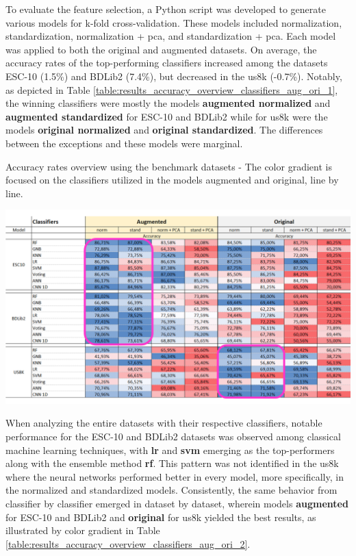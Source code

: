 To evaluate the feature selection, a Python script was developed to generate various models for k-fold cross-validation. These models included normalization, standardization, normalization + \gls{pca}, and standardization + \gls{pca}. Each model was applied to both the original and augmented datasets. On average, the accuracy rates of the top-performing classifiers increased among the datasets ESC-10 (1.5\%) and BDLib2 (7.4\%), but decreased in the \gls{us8k} (-0.7\%). Notably, as depicted in Table \ref{table:results_accuracy_overview_classifiers_aug_ori_1}, the winning classifiers were mostly the models \textbf{augmented normalized} and \textbf{augmented standardized} for ESC-10 and BDLib2 while for \gls{us8k} were the models \textbf{original normalized} and \textbf{original standardized}. The differences between the exceptions and these models were marginal.

\begin{table}[ht!]
    \caption[Accuracy rates overview using the benchmark datasets - Models augmented x original (Focus on the classifiers line by line)]{Accuracy rates overview using the benchmark datasets - The color gradient is focused on the classifiers utilized in the models augmented and original, line by line.}
    \label{table:results_accuracy_overview_classifiers_aug_ori_1}
     \raggedright
    \includegraphics[width=1\textwidth]{resources/images/060-results/Results_classification_overview_aug_x_ori_1.png}
\end{table}

When analyzing the entire datasets with their respective classifiers, notable performance for the ESC-10 and BDLib2 datasets was observed among classical machine learning techniques, with \textbf{\gls{lr}} and \textbf{\gls{svm}} emerging as the top-performers along with the ensemble method \textbf{\gls{rf}}. This pattern was not identified in the \gls{us8k} where the neural networks performed better in every model, more specifically, in the normalized and standardized models. Consistently, the same behavior from classifier by classifier emerged in dataset by dataset, wherein models \textbf{augmented} for ESC-10 and BDLib2 and \textbf{original} for \gls{us8k} yielded the best results, as illustrated by color gradient in Table \ref{table:results_accuracy_overview_classifiers_aug_ori_2}. 

